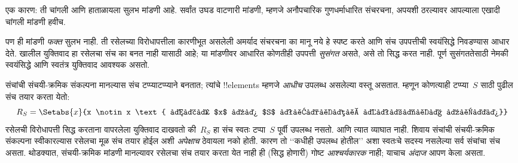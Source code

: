 \documentclass[../../../include/open-logic-section]{subfiles}
\begin{document}
एक कारण:
ती चांगली
आणि हाताळायला
सुलभ मांडणी
आहे. सर्वांत
उघड वाटणारी
मांडणी,
म्हणजे
अनौपचारिक
गुणधर्माधारित
संचरचना,
अपयशी ठरल्यावर
आपल्याला
एखादी चांगली
मांडणी हवीच.

पण ही मांडणी \emph{फक्त} सुलभ नाही.
ती रसेलच्या विरोधापत्तीला कारणीभूत असलेली
अमर्याद संचरचना का मानू नये हे स्पष्ट करते
आणि संच उपपत्तीची स्वयंसिद्धे निवडण्यास आधार देते.
खालील युक्तिवाद हा रसेलचा संच का बनत नाही यासाठी आहे;
या मांडणीवर आधारित कोणतीही उपपत्ती \emph{सुसंगत} असते,
असे तो सिद्ध करत नाही. पूर्ण सुसंगततेसाठी
नेमकी स्वयंसिद्धे आणि स्वतंत्र युक्तिवाद आवश्यक असतो.

संचांची
संचयी-क्रमिक
संकल्पना
मानल्यास
संच
टप्प्याटप्प्याने
बनतात;
त्यांचे
!!{element}s
म्हणजे
\emph{आधीच}
उपलब्ध
असलेल्या
वस्तू असतात.
म्हणून
कोणत्याही
टप्प्या~$S$
साठी
पुढील संच
तयार करता
येतो:
\[
  R_S = \Setabs{x}{x \notin x \text{ आणि $x$ हा $S$ पूर्वी उपलब्ध होता}}
\]
रसेलची
विरोधापत्ती
सिद्ध करताना
वापरलेला
युक्तिवाद
दाखवतो
की~$R_S$
हा संच
स्वतः
टप्पा~$S$
पूर्वी
उपलब्ध
नसतो.
आणि
त्यात
व्याघात
नाही.
शिवाय
संचांची
संचयी-क्रमिक
संकल्पना
स्वीकारल्यास
रसेलचा
मूळ संच
तयार होईल
अशी
\emph{अपेक्षाच}
ठेवायला
नको होती.
कारण तो
‘‘कधीही
उपलब्ध
होतील’’
अशा
स्वतःचे
सदस्य
नसलेल्या
सर्व
संचांचा
संच
असता.
थोडक्यात,
संचयी-क्रमिक
मांडणी
मानल्यावर
रसेलचा
संच तयार
करता
येत
नाही
ही
(सिद्ध
होणारी)
गोष्ट
\emph{आश्चर्यकारक}
नाही;
याचाच
\emph{अंदाज}
आपण
केला
असता.

%

\end{document}
